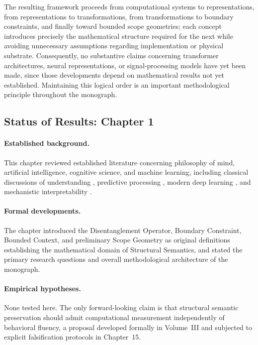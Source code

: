 \documentclass[11pt,twoside,openright]{book}
\numberwithin{equation}{chapter}
\theoremstyle{definition}
\theoremstyle{plain}
\theoremstyle{remark}
\theoremstyle{definition}
\begin{document}
The resulting framework proceeds from computational systems to
representations, from representations to transformations, from
transformations to boundary constraints, and finally toward bounded scope
geometries; each concept introduces precisely the mathematical structure
required for the next while avoiding unnecessary assumptions regarding
implementation or physical substrate. Consequently, no substantive claims
concerning transformer architectures, neural representations, or
signal-processing models have yet been made, since those developments
depend on mathematical results not yet established. Maintaining this
logical order is an important methodological principle throughout the
monograph.

\subsection*{Status of Results: Chapter 1}

\paragraph{Established background.} This chapter reviewed established
literature concerning philosophy of mind, artificial intelligence,
cognitive science, and machine learning, including classical discussions
of understanding \cite{Turing1950,Searle1980,Block1995}, predictive
processing \cite{Friston2010,Clark2013}, modern deep learning
\cite{Goodfellow2016,Vaswani2017}, and mechanistic interpretability
\cite{Olah2020,Elhage2021}.

\paragraph{Formal developments.} The chapter introduced the
Disentanglement Operator, Boundary Constraint, Bounded Context, and
preliminary Scope Geometry as original definitions establishing the
mathematical domain of Structural Semantics, and stated the primary
research questions and overall methodological architecture of the
monograph.

\paragraph{Empirical hypotheses.} None tested here. The only
forward-looking claim is that structural semantic preservation should
admit computational measurement independently of behavioral fluency, a
proposal developed formally in Volume~III and subjected to explicit
falsification protocols in Chapter~15.
\end{document}
